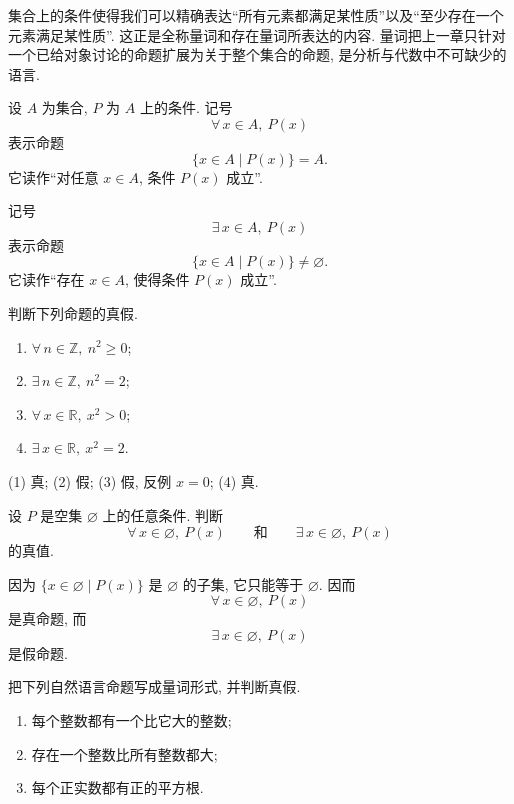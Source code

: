 \documentclass[usesamecnt, thmcnt=section, lang=cn, newtx, 10pt, scheme=chinese]{elegantbook}
\begin{document}
集合上的条件使得我们可以精确表达``所有元素都满足某性质''以及``至少存在一个元素满足某性质''. 这正是全称量词和存在量词所表达的内容. 量词把上一章只针对一个已给对象讨论的命题扩展为关于整个集合的命题, 是分析与代数中不可缺少的语言.

\begin{definition}[全称量词与存在量词]\label{def:sets-quantifiers}
设 $A$ 为集合, $P $ 为 $A$ 上的条件. 记号
\[
 \forall\,x\in A,\ P(x)
\]
表示命题
\[
 \{x\in A\mid P(x)\}=A.
\]
它读作``对任意 $x\in A$, 条件 $P(x)$ 成立''.

记号
\[
 \exists\,x\in A,\ P(x)
\]
表示命题
\[
 \{x\in A\mid P(x)\}\neq\varnothing.
\]
它读作``存在 $x\in A$, 使得条件 $P(x)$ 成立''.
\end{definition}

\begin{concept}\label{con:sets-09}
判断下列命题的真假.
\begin{enumerate}[label=\rm(\arabic*)]
  \item $\forall\,n\in\mathbb Z,\ n^2\geq0$;
  \item $\exists\,n\in\mathbb Z,\ n^2=2$;
  \item $\forall\,x\in\mathbb R,\ x^2>0$;
  \item $\exists\,x\in\mathbb R,\ x^2=2$.
\end{enumerate}
\end{concept}

\begin{solution}
(1) 真; (2) 假; (3) 假, 反例 $x=0$; (4) 真. 
\end{solution}


\begin{example}\label{ex:sets-empty-quantifier}
设 $P $ 是空集 $\varnothing$ 上的任意条件. 判断
\[
 \forall\,x\in\varnothing,\ P(x)
 \qquad\text{和}\qquad
 \exists\,x\in\varnothing,\ P(x)
\]
的真值.
\end{example}

\begin{solution}
因为 $\{x\in\varnothing\mid P(x)\}$ 是 $\varnothing$ 的子集, 它只能等于 $\varnothing$. 因而
\[
 \forall\,x\in\varnothing,\ P(x)
\]
是真命题, 而
\[
 \exists\,x\in\varnothing,\ P(x)
\]
是假命题.
\end{solution}

\begin{exercise}\label{ex:sets-quantifier-01}
把下列自然语言命题写成量词形式, 并判断真假.
\begin{enumerate}[label=\rm(\arabic*)]
  \item 每个整数都有一个比它大的整数;
  \item 存在一个整数比所有整数都大;
  \item 每个正实数都有正的平方根.
\end{enumerate}
\end{exercise}
\end{document}
